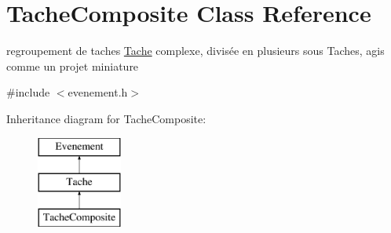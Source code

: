 \hypertarget{class_tache_composite}{}\section{Tache\+Composite Class Reference}
\label{class_tache_composite}


regroupement de taches \hyperlink{class_tache}{Tache} complexe, divisée en plusieurs sous Taches, agis comme un projet miniature  




{\ttfamily \#include $<$evenement.\+h$>$}

Inheritance diagram for Tache\+Composite\+:\begin{figure}[H]
\begin{center}
\leavevmode
\includegraphics[height=3.000000cm]{class_tache_composite}
\end{center}
\end{figure}
